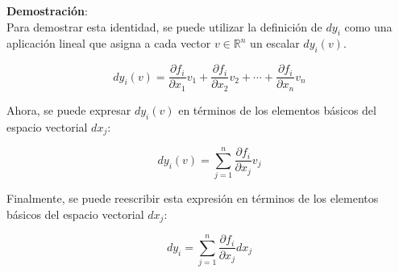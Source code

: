 


\textbf{Demostración}: \\

Para demostrar esta identidad, se puede utilizar la definición de $dy_i$ como una aplicación lineal que asigna a cada vector $v \in \mathbb{R}^n$ un escalar $dy_i(v)$.

\begin{equation*}
dy_i(v) = \frac{\partial f_i}{\partial x_1} v_1 + \frac{\partial f_i}{\partial x_2} v_2 + \cdots + \frac{\partial f_i}{\partial x_n} v_n
\end{equation*}

Ahora, se puede expresar $dy_i(v)$ en términos de los elementos básicos del espacio vectorial $dx_j$:

\begin{equation*}
dy_i(v) = \sum_{j=1}^{n} \frac{\partial f_i}{\partial x_j} v_j
\end{equation*}

Finalmente, se puede reescribir esta expresión en términos de los elementos básicos del espacio vectorial $dx_j$:

\begin{equation*}
dy_i = \sum_{j=1}^{n} \frac{\partial f_i}{\partial x_j} dx_j
\end{equation*}

